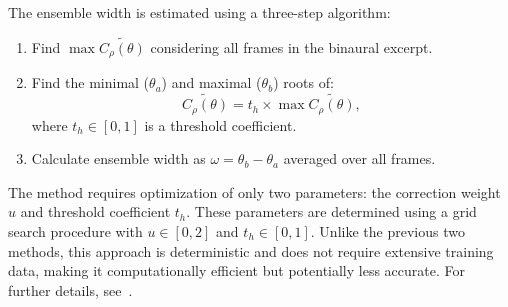 The ensemble width is estimated using a three-step algorithm:

\begin{enumerate}
\item Find $\max \widetilde{C_\rho(\theta)}$ considering all frames in the binaural excerpt.
\item Find the minimal ($\theta_a$) and maximal ($\theta_b$) roots of:
      \begin{equation}
      \widetilde{C_\rho(\theta)} = t_h \times \max \widetilde{C_\rho(\theta)},
      \end{equation}
      where $t_h \in [0,1]$ is a threshold coefficient.
\item Calculate ensemble width as $\omega = \theta_b - \theta_a$ averaged over all frames.
\end{enumerate}

The method requires optimization of only two parameters: the correction weight $u$ and threshold coefficient $t_h$. These parameters are determined using a grid search procedure with $u \in [0,2]$ and $t_h \in [0,1]$. Unlike the previous two methods, this approach is deterministic and does not require extensive training data, making it computationally efficient but potentially less accurate. For further details, see~\cite{antoniuk_blind_2023}.


